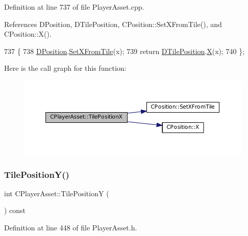 Definition at line 737 of file Player\+Asset.\+cpp.



References D\+Position, D\+Tile\+Position, C\+Position\+::\+Set\+X\+From\+Tile(), and C\+Position\+::\+X().


\begin{DoxyCode}
737                                     \{
738     \hyperlink{classCPlayerAsset_aa9f53c009b181c7c5647c6b03776a04c}{DPosition}.\hyperlink{classCPosition_ac6a1eeaeb98e20942efea7cf253b2ec4}{SetXFromTile}(x);
739     \textcolor{keywordflow}{return} \hyperlink{classCPlayerAsset_a5b59a9d3b7db8c7fa194b80dafb96186}{DTilePosition}.\hyperlink{classCPosition_a9a6b94d3b91df1492d166d9964c865fc}{X}(x);
740 \};
\end{DoxyCode}
Here is the call graph for this function\+:\nopagebreak
\begin{figure}[H]
\begin{center}
\leavevmode
\includegraphics[width=350pt]{classCPlayerAsset_ad3a0b4bafbfa9021b59925a5c3364cd5_cgraph}
\end{center}
\end{figure}
\hypertarget{classCPlayerAsset_a189adb25bf0a45117a9c0bb36b45e6a4}{}\label{classCPlayerAsset_a189adb25bf0a45117a9c0bb36b45e6a4} 
\subsubsection{\texorpdfstring{Tile\+Position\+Y()}{TilePositionY()}\hspace{0.1cm}{\footnotesize\ttfamily [1/2]}}
{\footnotesize\ttfamily int C\+Player\+Asset\+::\+Tile\+PositionY (\begin{DoxyParamCaption}{ }\end{DoxyParamCaption}) const\hspace{0.3cm}{\ttfamily [inline]}}



Definition at line 448 of file Player\+Asset.\+h.



